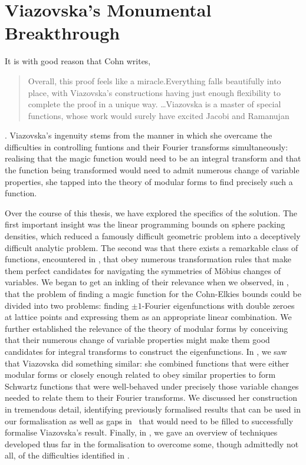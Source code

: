 \section{Viazovska's Monumental Breakthrough}

It is with good reason that Cohn writes,
\begin{quote}
    Overall, this proof feels like a miracle.Everything falls beautifully into place, with Viazovska’s constructions having just enough flexibility to complete the proof in a unique way. \ldots Viazovska is a master of special functions, whose work would surely have excited Jacobi and Ramanujan
\end{quote}
\cite[p.21]{CohnOnViazovskaICM}. Viazovska's ingenuity stems from the manner in which she overcame the difficulties in controlling funtions and their Fourier transforms simultaneously: realising that the magic function would need to be an integral transform and that the function being transformed would need to admit numerous change of variable properties, she tapped into the theory of modular forms to find precisely such a function.

Over the course of this thesis, we have explored the specifics of the solution. The first important insight was the linear programming bounds on sphere packing densities, which reduced a famously difficult geometric problem into a deceptively difficult analytic problem. The second was that there exists a remarkable class of functions, encountered in , that obey numerous transformation rules that make them perfect candidates for navigating the symmetries of Möbius changes of variables. We began to get an inkling of their relevance when we observed, in , that the problem of finding a magic function for the Cohn-Elkies bounds could be divided into two problems: finding $\pm 1$-Fourier eigenfunctions with double zeroes at lattice points and expressing them as an appropriate linear combination. We further established the relevance of the theory of modular forms by conceiving that their numerous change of variable properties might make them good candidates for integral transforms to construct the eigenfunctions. In , we saw that Viazovska did something similar: she combined functions that were either modular forms or closely enough related to obey similar properties to form Schwartz functions that were well-behaved under precisely those variable changes needed to relate them to their Fourier transforms. We discussed her construction in tremendous detail, identifying previously formalised results that can be used in our formalisation as well as gaps in \mathlib\ that would need to be filled to successfully formalise Viazovska's result. Finally, in , we gave an overview of techniques developed thus far in the formalisation to overcome some, though admittedly not all, of the difficulties identified in .

